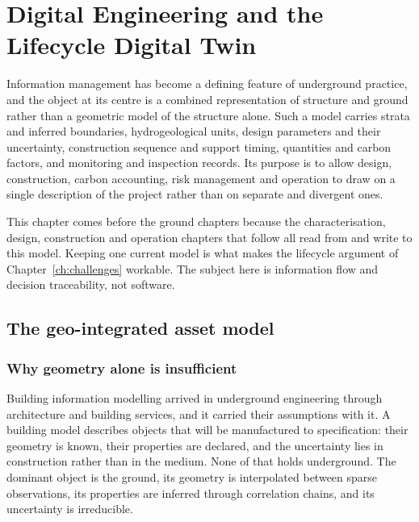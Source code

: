 %
\chapter{Digital Engineering and the Lifecycle Digital Twin}
\label{ch:digital-twin}

Information management has become a defining feature of underground practice,
and the object at its centre is a combined representation of structure and
ground rather than a geometric model of the structure alone. Such a model carries strata
and inferred boundaries, hydrogeological units, design parameters and their
uncertainty, construction sequence and support timing, quantities and carbon
factors, and monitoring and inspection records. Its purpose is to allow
design, construction, carbon accounting, risk management and operation to draw
on a single description of the project rather than on separate and divergent
ones.

This chapter comes before the ground chapters because the
characterisation, design, construction and operation chapters that follow all
read from and write to this model. Keeping one current
model is what makes the lifecycle argument of Chapter~\ref{ch:challenges}
workable. The subject here is information flow and
decision traceability, not software.

\section{The geo-integrated asset model}
\label{sec:geo-integrated-model}

\subsection{Why geometry alone is insufficient}
\label{sec:beyond-geometry}

Building information modelling arrived in underground engineering through
architecture and building services, and it carried their assumptions with it.
A building model describes objects that will be manufactured to specification:
their geometry is known, their properties are declared, and the uncertainty
lies in construction rather than in the medium. None of that holds
underground. The dominant object is the ground, its geometry is interpolated
between sparse observations, its properties are inferred through correlation
chains, and its uncertainty is irreducible.

